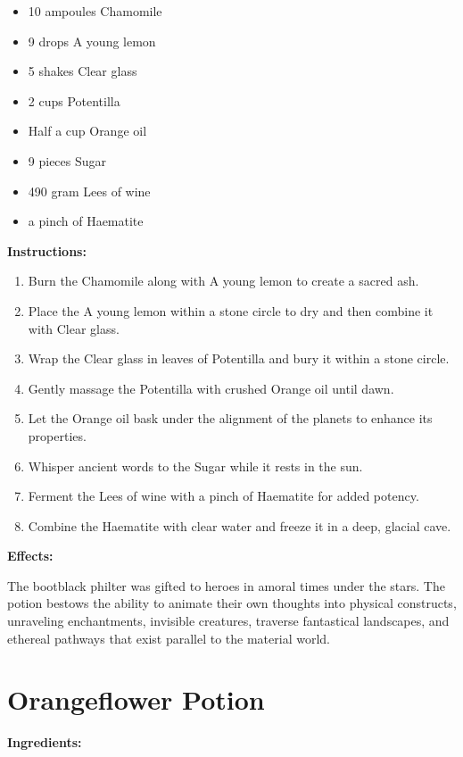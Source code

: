 \documentclass{article}
\begin{document}
\begin{itemize}
  \item 10 ampoules Chamomile
  \item 9 drops A young lemon
  \item 5 shakes Clear glass
  \item 2 cups Potentilla
  \item Half a cup Orange oil
  \item 9 pieces Sugar
  \item 490 gram Lees of wine
  \item a pinch of Haematite
\end{itemize}

\textbf{Instructions:}

\begin{enumerate}
  \item Burn the Chamomile along with A young lemon to create a sacred ash.
  \item Place the A young lemon within a stone circle to dry and then combine it with Clear glass.
  \item Wrap the Clear glass in leaves of Potentilla and bury it within a stone circle.
  \item Gently massage the Potentilla with crushed Orange oil until dawn.
  \item Let the Orange oil bask under the alignment of the planets to enhance its properties.
  \item Whisper ancient words to the Sugar while it rests in the sun.
  \item Ferment the Lees of wine with a pinch of Haematite for added potency.
  \item Combine the Haematite with clear water and freeze it in a deep, glacial cave.
\end{enumerate}

\textbf{Effects:}

The bootblack philter was gifted to heroes in amoral times under the stars. The potion bestows the ability to animate their own thoughts into physical constructs, unraveling enchantments, invisible creatures, traverse fantastical landscapes, and ethereal pathways that exist parallel to the material world.

\newpage
\section*{Orangeflower Potion}

\textbf{Ingredients:}
\end{document}

